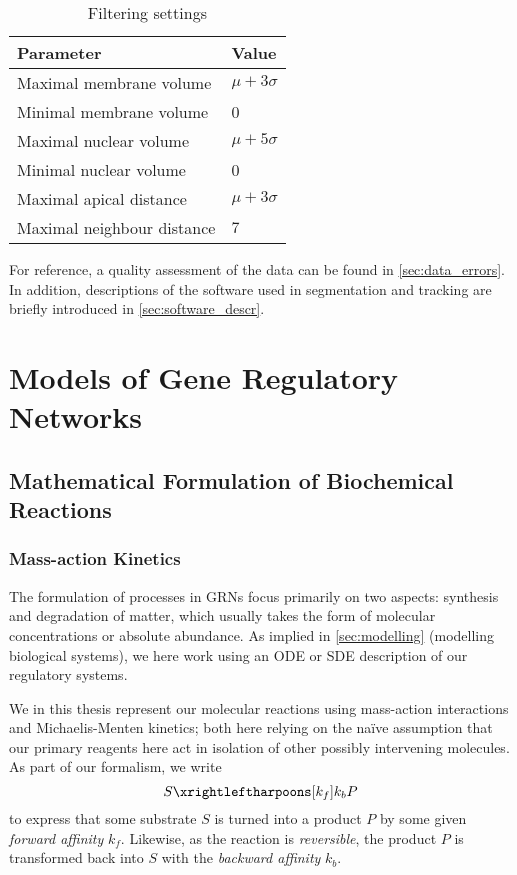 \begin{table}
  \centering
  \begin{tabular}{ll}    \toprule
    Parameter & Value \\ \midrule
    Maximal membrane volume & $\mu + 3\sigma$ \\
    Minimal membrane volume & 0 \\
    Maximal nuclear volume  & $\mu + 5\sigma$ \\
    Minimal nuclear volume  & 0 \\
    Maximal apical distance & $\mu + 3\sigma$ \\
    Maximal neighbour distance & $7$ \\
  \end{tabular}
  \caption{Filtering settings}
  \label{tab:filtering}
\end{table}

For reference, a quality assessment of the data can be found in
\cref{sec:data_errors}. In addition, descriptions of the software used in
segmentation and tracking are briefly introduced in \cref{sec:software_descr}.

\section[Models of Gene Regulatory Networks]{Models of Gene Regulatory Networks}
\subsection[Mathematical Formulation]{Mathematical Formulation of Biochemical
  Reactions}

\subsubsection[Mass-action Kinetics]{Mass-action Kinetics}
The formulation of processes in GRNs focus primarily on two aspects: synthesis
and degradation of matter, which usually takes the form of molecular
concentrations or absolute abundance. As implied in \cref{sec:modelling}
(modelling biological systems), we here work using an ODE or SDE description of
our regulatory systems. 

We in this thesis represent our molecular reactions using mass-action
interactions and Michaelis-Menten kinetics; both here relying on the na\"ive
assumption that our primary reagents here act in isolation of other possibly
intervening molecules. As part of our formalism, we write
\begin{equation}
  S \xrightleftharpoons[k_{f}]{k_{b}} P
  \label{eq:simple_reac}
\end{equation}
to express that some substrate $S$ is turned into a product $P$ by some given
\textit{forward affinity} $k_f$. Likewise, as the reaction is \textit{reversible}, the
product $P$ is transformed back into $S$ with the \textit{backward affinity}
$k_b$. 

